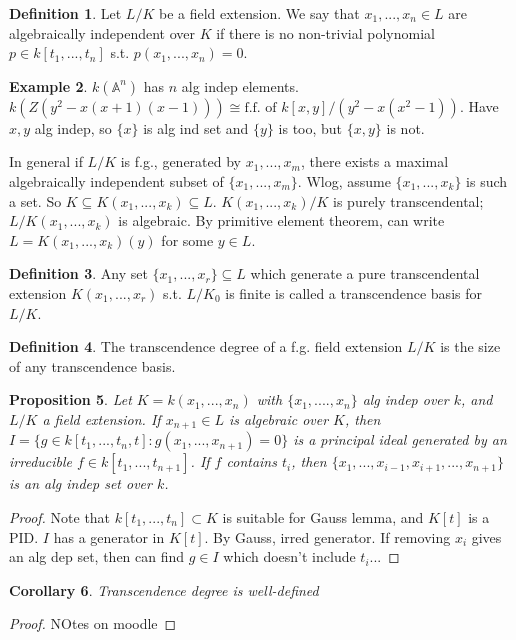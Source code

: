 \documentclass{article}
\theoremstyle{definition}
\newtheorem{defn}{Definition}[section]
\newtheorem{example}[defn]{Example}
\theoremstyle{remark}
\theoremstyle{plain}
\newtheorem{prop}[defn]{Proposition}
\newtheorem{crly}[defn]{Corollary}
\newcommand{\bA}{\mathbb{A}}
\begin{document}
\begin{defn}
    Let $L/K$ be a field extension. We say that $x_1,...,x_n\in L$ are algebraically independent over $K$ if there is no non-trivial polynomial $p\in k[t_1,...,t_n]$ s.t. $p(x_1,...,x_n)=0$.
\end{defn}
\begin{example}
    $k(\bA^n)$ has $n$ alg indep elements.\\
    $k(Z(y^2-x(x+1)(x-1)))\cong \text{f.f. of }k[x,y]/(y^2-x(x^2-1))$. Have $x,y$ alg indep, so $\{x\}$ is alg ind set and $\{y\}$ is too, but $\{x,y\}$ is not.
\end{example}
In general if $L/K$ is f.g., generated by $x_1,...,x_m$, there exists a maximal algebraically independent subset of $\{x_1,...,x_m\}$. Wlog, assume $\{x_1,...,x_k\}$ is such a set. So $K\subseteq K(x_1,...,x_k)\subseteq L$. $K(x_1,...,x_k)/K$ is purely transcendental; $L/K(x_1,...,x_k)$ is algebraic. By primitive element theorem, can write $L=K(x_1,...,x_k)(y)$ for some $y\in L$.
\begin{defn}
    Any set $\{x_1,...,x_r\}\subseteq L$ which generate a pure transcendental extension $K(x_1,...,x_r)$ s.t. $L/K_0$ is finite is called a transcendence basis for $L/K$.
\end{defn}
\begin{defn}
    The transcendence degree of a f.g. field extension $L/K$ is the size of any transcendence basis.
\end{defn}
\begin{prop}
    Let $K=k(x_1,...,x_n)$ with $\{x_1,....,x_n\}$ alg indep over $k$, and $L/K$ a field extension. If $x_{n+1}\in L$ is algebraic over $K$, then $I=\{g\in k[t_1,...,t_{n},t]:g(x_1,...,x_{n+1})=0\}$ is a principal ideal generated by an irreducible $f\in k[t_1,...,t_{n+1}]$. If $f$ contains $t_i$, then $\{x_1,...,x_{i-1},x_{i+1},...,x_{n+1}\}$ is an alg indep set over $k$.
\end{prop}
\begin{proof}
    Note that $k[t_1,...,t_n]\subset K$ is suitable for Gauss lemma, and $K[t]$ is a PID. $I$ has a generator in $K[t]$. By Gauss, irred generator.
    If removing $x_i$ gives an alg dep set, then can find $g\in I$ which doesn't include $t_i$...
\end{proof}
\begin{crly}
    Transcendence degree is well-defined
\end{crly}
\begin{proof}
    NOtes on moodle
\end{proof}
\end{document}
